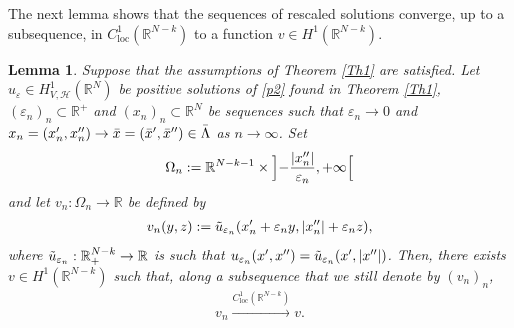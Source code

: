 \documentclass[a4paper]{amsart}
\newtheorem{lemma}[proposition]{Lemma}
\begin{document}
The next lemma shows that the sequences of rescaled solutions converge, up to a subsequence, in
$C^1_{\mathrm{loc}}({\mathbb{R}}^{N-k})$ to a function $v \in H^1({\mathbb{R}}^{N-k})$. 
\begin{lemma}
\label{convergentSubsequence}
Suppose that the assumptions of Theorem \ref{Th1} are satisfied. Let $u_{\varepsilon}\in H^1_{V,\mathcal{H}}({\mathbb{R}}^N)$ be
positive solutions of \eqref{p2} found in Theorem \ref{Th1}, $(\varepsilon_n)_n \subset {\mathbb{R}}^+$ and $(x_n)_n \subset
{\mathbb{R}}^N$ be sequences such that $\varepsilon_n \to 0$ and $x_n = (x'_n,x''_n) \to \bar{x} =
(\bar{x}',\bar{x}'') \in \Bar{\Lambda}$ as $n\to \infty$. Set 
\[
  \Omega_n := {\mathbb{R}}^{N-k-1} \times \Bigl] -\frac{{\left| {x''_n} \right|}}{\varepsilon_n}, +\infty \Bigr[
\] 
and let  $v_n : \Omega_n \to {\mathbb{R}}$ be defined by
\begin{align}\label{def:vn}
 v_n(y, z) := \Tilde{u}_{\varepsilon_n}(x'_{n} + \varepsilon_n y, {\left| {x''_{n}} \right|} + \varepsilon_n z),
\end{align}
where $\Tilde{u}_{\varepsilon_n} : {\mathbb{R}}^{N-k}_+ \to {\mathbb{R}}$ is such that $u_{\varepsilon_n}(x',x'')
=\Tilde{u}_{\varepsilon_n}(x', {\left| {x''} \right|})$. Then, there exists $v \in H^1({\mathbb{R}}^{N-k})$ such that, along a subsequence that we still denote by $(v_n)_n$,
\begin{align*}
 v_n \stackrel{C^1_{\mathrm{loc}}({\mathbb{R}}^{N-k})}{\longrightarrow} v.
\end{align*}
\end{lemma}
\end{document}

